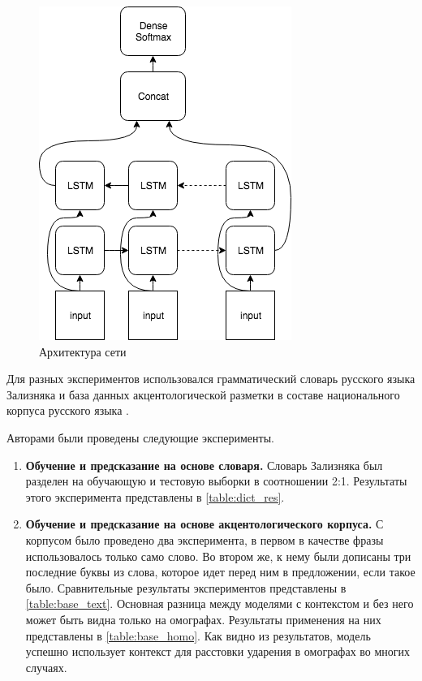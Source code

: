 \documentclass[14pt, a4paper, russian]{extreport}
\begin{document}
\begin{figure}[H]
	\begin{center}
		\includegraphics[width=0.5\linewidth]{Baseline}
	\end{center}
	\caption{\small{Архитектура сети}}
	\label{fig:base_global}
\end{figure}

Для разных экспериментов использовался грамматический словарь русского языка Зализняка \cite{zaliz} и база данных акцентологической разметки в составе национального корпуса русского языка \cite{grishina}. 

Авторами были проведены следующие эксперименты.
\begin{enumerate}[  1{)} ]
	\item \textbf{Обучение и предсказание на основе словаря.} Словарь Зализняка был разделен на обучающую и тестовую выборки в соотношении 2:1. Результаты этого эксперимента представлены в \cref{table:dict_res}.
	\item \textbf{Обучение и предсказание на основе акцентологического корпуса.} С корпусом было проведено два эксперимента, в первом в качестве фразы использовалось только само слово. Во втором же, к нему были дописаны три последние буквы из слова, которое идет перед ним в предложении, если такое было. Сравнительные результаты экспериментов представлены в \cref{table:base_text}. Основная разница между моделями с контекстом и без него может быть видна только на омографах. Результаты применения на них представлены в \cref{table:base_homo}. Как видно из результатов, модель успешно использует контекст для расстовки ударения в омографах во многих случаях.
\end{enumerate}
\end{document}
